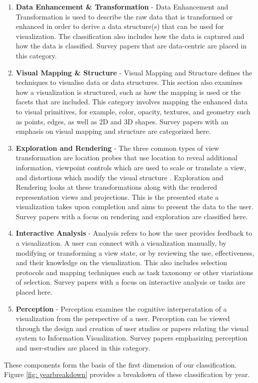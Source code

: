\begin{enumerate}

\item \textbf{Data Enhancement \& Transformation} - Data Enhancement and Transformation is used to describe the raw data that is transformed or enhanced in order to derive a data structure(s) that can be used for visualization. The classification also includes how the data is captured and how the data is classified. Survey papers that are data-centric are placed in this category. \label{class1}

\item \textbf{Visual Mapping \& Structure} - Visual Mapping and Structure defines the techniques to visualise data or data structures. This section also examines how a visualization is structured, such as how the mapping is used or the facets that are included. This category involves mapping the enhanced data to visual primitives, for example, color, opacity, textures, and geometry such as points, edges, as well as 2D and 3D shapes. Survey papers with an emphasis on visual mapping and structure are categorized here. \label{class2}

\item \textbf{Exploration and Rendering} - The three common types of view transformation are location probes that use location to reveal additional information, viewpoint controls which are used to scale or translate a view, and distortions which modify the visual structure \cite{card1999readings}. Exploration and Rendering looks at these transformations along with the rendered representation views and projections. This is the presented state a visualization takes upon completion and aims to present the data to the user. Survey papers with a focus on rendering and exploration are classified here. \label{class3}

\item \textbf{Interactive Analysis} - Analysis refers to how the user provides feedback to a visualization. A user can connect with a visualization manually, by modifying or transforming a view state, or by reviewing the use, effectiveness, and their knowledge on the visualization. This also includes selection protocols and mapping techniques such as task taxonomy or other viariations of selection. Survey papers with a focus on interactive analysis or tasks are placed here. \label{class4}

\item \textbf{Perception} - Perception examines the cognitive interperatation of a visualization from the perspective of a user. Perception can be viewed through the design and creation of user studies or papers relating the visual system to Information Visualization. Survey papers emphasizing perception and user-studies are placed in this category. \label{class5}

\end{enumerate}
These components form the basis of the first dimension of our classification. Figure \ref{fig: yearbreakdown} provides a breakdown of these classification by year.

